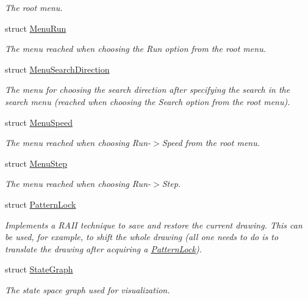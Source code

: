 \begin{DoxyCompactItemize}
\begin{DoxyCompactList}\small\item\em The root menu. \end{DoxyCompactList}\item 
struct \hyperlink{structslb_1_1core_1_1ui_1_1MenuRun}{Menu\+Run}
\begin{DoxyCompactList}\small\item\em The menu reached when choosing the Run option from the root menu. \end{DoxyCompactList}\item 
struct \hyperlink{structslb_1_1core_1_1ui_1_1MenuSearchDirection}{Menu\+Search\+Direction}
\begin{DoxyCompactList}\small\item\em The menu for choosing the search direction after specifying the search in the search menu (reached when choosing the Search option from the root menu). \end{DoxyCompactList}\item 
struct \hyperlink{structslb_1_1core_1_1ui_1_1MenuSpeed}{Menu\+Speed}
\begin{DoxyCompactList}\small\item\em The menu reached when choosing Run-\/$>$Speed from the root menu. \end{DoxyCompactList}\item 
struct \hyperlink{structslb_1_1core_1_1ui_1_1MenuStep}{Menu\+Step}
\begin{DoxyCompactList}\small\item\em The menu reached when choosing Run-\/$>$Step. \end{DoxyCompactList}\item 
struct \hyperlink{structslb_1_1core_1_1ui_1_1PatternLock}{Pattern\+Lock}
\begin{DoxyCompactList}\small\item\em Implements a R\+A\+II technique to save and restore the current drawing. This can be used, for example, to shift the whole drawing (all one needs to do is to translate the drawing after acquiring a \hyperlink{structslb_1_1core_1_1ui_1_1PatternLock}{Pattern\+Lock}). \end{DoxyCompactList}\item 
struct \hyperlink{structslb_1_1core_1_1ui_1_1StateGraph}{State\+Graph}
\begin{DoxyCompactList}\small\item\em The state space graph used for visualization. \end{DoxyCompactList}\item 

\end{DoxyCompactItemize}
